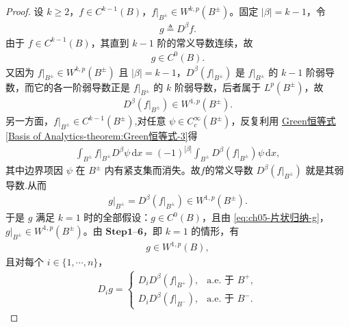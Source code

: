 \documentclass[../../main.tex]{subfiles}
\begin{document}
\begin{proof}
设 $k\geqslant2$，$f\in C^{k-1}(B)$，$f|_{B^{\pm}}\in W^{k,p}(B^{\pm})$。固定 $|\beta|=k-1$，令
\begin{align*}
g\triangleq D^{\beta}f.
\end{align*}
由于 $f\in C^{k-1}(B)$，其直到 $k-1$ 阶的常义导数连续，故
\begin{align*}
g\in C^{0}(B).
\end{align*}
又因为 $f|_{B^{\pm}}\in W^{k,p}(B^{\pm})$ 且 $|\beta|=k-1$，$D^{\beta}(f|_{B^{\pm}})$ 是 $f|_{B^{\pm}}$ 的 $k-1$ 阶弱导数，而它的各一阶弱导数正是 $f|_{B^{\pm}}$ 的 $k$ 阶弱导数，后者属于 $L^{p}(B^{\pm})$，故
\begin{align*}
D^{\beta}(f|_{B^{\pm}})\in W^{1,p}(B^{\pm}).
\end{align*}
另一方面，$f|_{B^{\pm}}\in C^{k-1}(B^{\pm})$,对任意 $\psi\in C_{c}^{\infty}(B^{\pm})$，反复利用
\hyperref[Basis of Analytics-theorem:Green恒等式-3]{Green恒等式\ref{Basis of Analytics-theorem:Green恒等式-3}}得
\begin{align*}
\int_{B^{\pm}}f|_{B^{\pm}}D^{\beta}\psi\,\mathrm{d}x
=(-1)^{|\beta|}\int_{B^{\pm}}D^{\beta}(f|_{B^{\pm}})\psi\,\mathrm{d}x,
\end{align*}
其中边界项因 $\psi$ 在 $B^{\pm}$ 内有紧支集而消失。故$f$的常义导数 $D^{\beta}(f|_{B^{\pm}})$ 就是其弱导数.从而
\begin{align}
g|_{B^{\pm}}=D^{\beta}(f|_{B^{\pm}})\in W^{1,p}(B^{\pm}).
\label{eq:ch05-片状归纳-g}
\end{align}
于是 $g$ 满足 $k=1$ 时的全部假设：$g\in C^{0}(B)$，且由 \eqref{eq:ch05-片状归纳-g}，$g|_{B^{\pm}}\in W^{1,p}(B^{\pm})$。由 $\mathbf{Step}\bm{1}$--$\bm{6}$，即 $k=1$ 的情形，有
\begin{align}
g\in W^{1,p}(B),
\label{eq:ch05-片状归纳-gW}
\end{align}
且对每个 $i\in\{1,\cdots,n\}$，
\begin{align}
D_{i}g=
\begin{cases}
D_{i}D^{\beta}(f|_{B^{+}}), & \text{a.e. 于 }B^{+},\\
D_{i}D^{\beta}(f|_{B^{-}}), & \text{a.e. 于 }B^{-}.
\end{cases}
\label{eq:ch05-片状归纳-Dig}
\end{align}


\end{proof}
\end{document}
